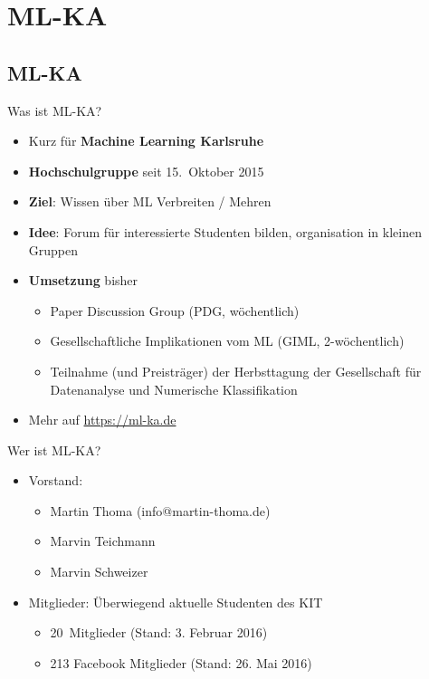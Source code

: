 \documentclass{beamer}
\begin{document}

\title{\titleText}
\date{ }
\subject{Machine Learning}

\frame{\titlepage}

\section{ML-KA}
\subsection{ML-KA}
\begin{frame}{Was ist ML-KA?}
    \begin{itemize}
        \item Kurz für \textbf{Machine Learning Karlsruhe}
        \item \textbf{Hochschulgruppe} seit 15.~Oktober 2015
        \item \textbf{Ziel}: Wissen über ML Verbreiten / Mehren
        \item \textbf{Idee}: Forum für interessierte Studenten bilden,
              organisation in kleinen Gruppen
        \item \textbf{Umsetzung} bisher
        \begin{itemize}
            \item Paper Discussion Group (PDG, wöchentlich)
            \item Gesellschaftliche Implikationen vom ML (GIML, 2-wöchentlich)
            \item Teilnahme (und Preisträger) der Herbsttagung der Gesellschaft
                  für Datenanalyse und Numerische Klassifikation
        \end{itemize}
        \item Mehr auf \href{https://ml-ka.de/}{https://ml-ka.de}
    \end{itemize}
\end{frame}

\begin{frame}{Wer ist ML-KA?}
    \begin{itemize}
        \item Vorstand:
        \begin{itemize}
            \item Martin Thoma (info@martin-thoma.de)
            \item Marvin Teichmann
            \item Marvin Schweizer
        \end{itemize}
        \item Mitglieder: Überwiegend aktuelle Studenten des KIT
        \begin{itemize}
            \item 20~Mitglieder (Stand: 3. Februar 2016)
            \item 213 Facebook Mitglieder (Stand: 26. Mai 2016)
        \end{itemize}
    \end{itemize}
\end{frame}
\end{document}
